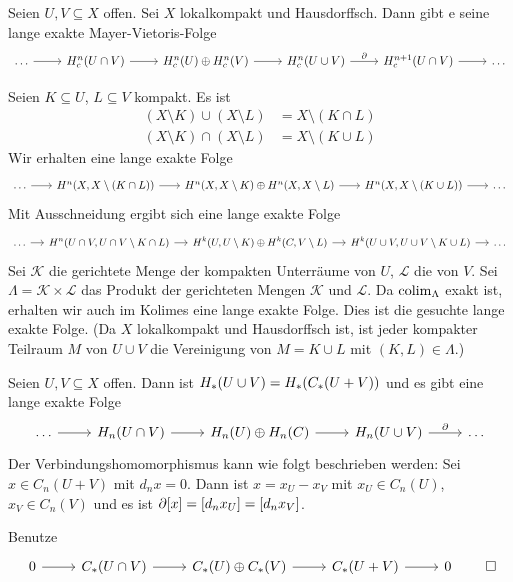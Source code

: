 \begin{satz}
	Seien $U,V \subseteq X$ offen. Sei $X$ lokalkompakt und Hausdorffsch. 
	Dann gibt e seine lange exakte Mayer-Vietoris-Folge 
	\[
		\begin{tikzcd}
			\ldots \rar & H^n_c(U\cap V) \rar & H^n_c(U) \oplus H^n_c(V) \rar & H^n_c(U \cup V) \rar["\partial"] & H^{n+1}_c(U\cap V) \rar & \ldots 
		\end{tikzcd}
	\]
\end{satz}
\begin{beweis}
	Seien $K \subseteq U$, $L \subseteq V$ kompakt. Es ist 
	\begin{align}
		(X\setminus K) \cup (X\setminus L) &= X \setminus (K \cap L) \\
		(X \setminus K) \cap (X \setminus L) &= X \setminus (K \cup L)
	\end{align}
	Wir erhalten eine lange exakte Folge 
	\[
		\begin{tikzcd}[sep=1.9em]
			\ldots \rar & H^n \enbrace*{X,X \setminus (K \cap L)} \rar & H^n \enbrace*{X,X \setminus K} \oplus H^n(X,X \setminus L) \rar & H^n \enbrace*{X,X \setminus (K \cup L)} \rar & \ldots 
		\end{tikzcd}
	\]
	Mit Ausschneidung ergibt sich eine lange exakte Folge 
	\[
		\begin{tikzcd}[sep=small,font=\small]
			\ldots  \rar & H^n \enbrace*{U \cap V, U  \cap V  \setminus K \cap L} \rar & H^k(U,U \setminus K) \oplus H^k(C,V \setminus L) \rar & H^k(U \cup V, U \cup V \setminus K \cup L) \rar & \ldots 
		\end{tikzcd}
	\]
	Sei $\mathcal{K}$ die gerichtete Menge der kompakten Unterräume von $U$, $\mathcal{L}$ die von $V$.
	Sei $\Lambda = \mathcal{K} \times \mathcal{L}$ das Produkt der gerichteten Mengen $\mathcal{K}$ und $\mathcal{L}$.
	Da $\colim_\Lambda$ exakt ist, erhalten wir auch im Kolimes eine lange exakte Folge. Dies ist die gesuchte lange exakte Folge. 
	(Da $X$ lokalkompakt und Hausdorffsch ist, ist jeder kompakter Teilraum $M$ von $U \cup V$ die Vereinigung von $M=K \cup L$ mit $(K,L) \in \Lambda$.)
\end{beweis}

\begin{erinnerung}
	Seien $U,V \subseteq X$ offen. Dann ist $H_*(U \cup V) = H_* \enbrace*{C_*(U+V)}$ und es gibt eine lange exakte Folge 
	\[
		\begin{tikzcd}
			\ldots  \rar & H_n(U \cap V) \rar & H_n(U) \oplus H_n(C) \rar & H_n(U \cup V) \rar["\partial"]& \ldots 
		\end{tikzcd}
	\]
	Der Verbindungshomomorphismus kann wie folgt beschrieben werden: Sei $x \in C_n(U + V)$ mit $d_n x =0$.
	Dann ist $x=x_U - x_V$ mit $x_U \in C_n(U)$, $x_V \in C_n(V)$ und es ist $\partial[x] = \benbrace*{d_n x_U} = \benbrace*{d_n x_V}$.
\end{erinnerung}
\begin{beweis}
	Benutze 
	\[
		\begin{tikzcd}
			0 \rar & C_*(U \cap V) \rar & C_*(U) \oplus C_*(V) \rar & C_*(U+V) \rar & 0
		\end{tikzcd} \qedhere
	\]
\end{beweis}

